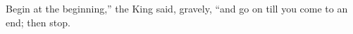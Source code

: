 \chapter*{}
\vspace*{\fill}
\begin{fquote}Begin at the beginning,'' the King said, gravely, ``and go on till you come to an end; then stop.
\end{fquote}
\cleardoublepage
